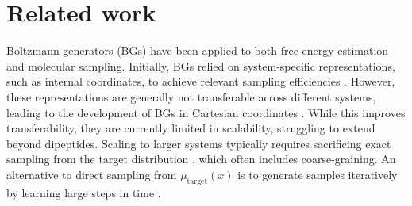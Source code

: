 \section{Related work}
\label{sec:related_work}
Boltzmann generators (BGs) \citep{noe2019boltzmann} have been applied to both free energy estimation \citep{wirnsberger2020targeted, rizzi2023multimap, schebek2024efficient} and molecular sampling. Initially, BGs relied on system-specific representations, such as internal coordinates, to achieve relevant sampling efficiencies \citep{noe2019boltzmann, kohler2021smooth, midgley2022flow, kohler2023rigid, dibak2021temperature}. However, these representations are generally not transferable across different systems, leading to the development of BGs in Cartesian coordinates \citep{klein2023equivariant, midgley2023se,klein2024transferable}. While this improves transferability, they are currently limited in scalability, struggling to extend beyond dipeptides. Scaling to larger systems typically requires sacrificing exact sampling from the target distribution  \citep{jing2022torsional,abdin2023pepflow,jing2024alphafold,lewis2024scalable}, which often includes coarse-graining. 
An alternative to direct sampling from $\mu_{\text{target}}(x)$ is to generate samples iteratively by learning large steps in time \citep{schreiner2023implicit, fu2023simulate, klein2023timewarp, diez2024boltzmann, jing2024generative, daigavane2024jamun}.